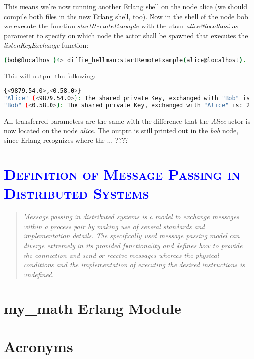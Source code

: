 \documentclass[xcolor=dvipsnames]{article}
\begin{document}
\noindent This means we're now running another Erlang shell on the node alice (we should compile both files in the new Erlang shell, too). Now in the shell of the node bob we execute the function \textit{startRemoteExample} with the atom \textit{alice@localhost} as parameter to specify on which node the actor shall be spawned that executes the \textit{listenKeyExchange} function:

\begin{lstlisting}[language=bash, numbers=none]
(bob@localhost)4> diffie_hellman:startRemoteExample(alice@localhost).
\end{lstlisting}

\noindent This will output the following:

\begin{lstlisting}[language=bash, numbers=none]
{<9879.54.0>,<0.58.0>}
"Alice" (<9879.54.0>): The shared private Key, exchanged with "Bob" is: 2
"Bob" (<0.58.0>): The shared private Key, exchanged with "Alice" is: 2
\end{lstlisting}

\noindent All transferred parameters are the same with the difference that the \textit{Alice} actor is now located on the node \textit{alice}. The output is still printed out in the \textit{bob} node, since Erlang recognizes where the ... ????\\

\section{\scshape{\textcolor{blue}{Definition of Message Passing in Distributed Systems}}}

\begin{quote}
\textit{Message passing in distributed systems is a model to exchange messages within a process pair by making use of several standards and implementation details. The specifically used message passing model can diverge extremely in its provided functionality and defines how to provide the connection and send or receive messages whereas the physical conditions and the implementation of executing the desired instructions is undefined.}
\end{quote}

\newpage

\begin{appendix}

\section{my\_math Erlang Module}\label{my_math}



\section{Acronyms}

\printnoidxglossaries

\end{appendix}
\end{document}
